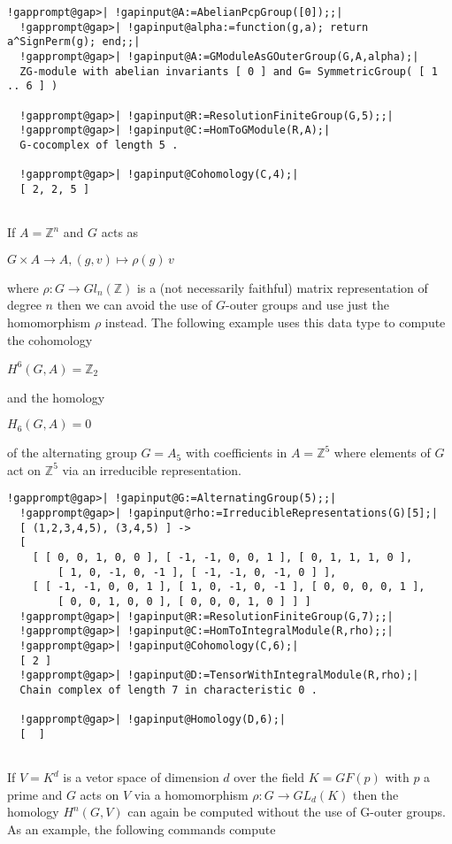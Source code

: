 \documentclass[a4paper,11pt]{report}
\begin{document}
{{\begin{Verbatim}[commandchars=!@|,fontsize=\small,frame=single,label=Example]
  !gapprompt@gap>| !gapinput@A:=AbelianPcpGroup([0]);;|
  !gapprompt@gap>| !gapinput@alpha:=function(g,a); return a^SignPerm(g); end;;|
  !gapprompt@gap>| !gapinput@A:=GModuleAsGOuterGroup(G,A,alpha);|
  ZG-module with abelian invariants [ 0 ] and G= SymmetricGroup( [ 1 .. 6 ] )
  
  !gapprompt@gap>| !gapinput@R:=ResolutionFiniteGroup(G,5);;|
  !gapprompt@gap>| !gapinput@C:=HomToGModule(R,A);|
  G-cocomplex of length 5 . 
  
  !gapprompt@gap>| !gapinput@Cohomology(C,4);|
  [ 2, 2, 5 ]
  
\end{Verbatim}
 

 If $A=\mathbb Z^n$ and $G$ acts as 

$G\times A \rightarrow A, (g, v) \mapsto \rho(g)\, v $ 

 where $\rho\colon G\rightarrow Gl_n(\mathbb Z)$ is a (not necessarily faithful) matrix representation of degree $n$ then we can avoid the use of $G$-outer groups and use just the homomorphism $\rho$ instead. The following example uses this data type to compute the cohomology 

$H^6(G,A) =\mathbb Z_2 $ 

and the homology 

$H_6(G,A) = 0 $ 

 of the alternating group $G=A_5$ with coefficients in $A=\mathbb Z^5$ where elements of $G$ act on $\mathbb Z^5$ via an irreducible representation. 
\begin{Verbatim}[commandchars=!@|,fontsize=\small,frame=single,label=Example]
  !gapprompt@gap>| !gapinput@G:=AlternatingGroup(5);;|
  !gapprompt@gap>| !gapinput@rho:=IrreducibleRepresentations(G)[5];|
  [ (1,2,3,4,5), (3,4,5) ] -> 
  [ 
    [ [ 0, 0, 1, 0, 0 ], [ -1, -1, 0, 0, 1 ], [ 0, 1, 1, 1, 0 ], 
        [ 1, 0, -1, 0, -1 ], [ -1, -1, 0, -1, 0 ] ], 
    [ [ -1, -1, 0, 0, 1 ], [ 1, 0, -1, 0, -1 ], [ 0, 0, 0, 0, 1 ], 
        [ 0, 0, 1, 0, 0 ], [ 0, 0, 0, 1, 0 ] ] ]
  !gapprompt@gap>| !gapinput@R:=ResolutionFiniteGroup(G,7);;|
  !gapprompt@gap>| !gapinput@C:=HomToIntegralModule(R,rho);;|
  !gapprompt@gap>| !gapinput@Cohomology(C,6);|
  [ 2 ]
  !gapprompt@gap>| !gapinput@D:=TensorWithIntegralModule(R,rho);|
  Chain complex of length 7 in characteristic 0 . 
  
  !gapprompt@gap>| !gapinput@Homology(D,6);|
  [  ]
  
\end{Verbatim}
 

If $V=K^d$ is a vetor space of dimension $d$ over the field $K=GF(p)$ with $p$ a prime and $G$ acts on $V$ via a homomorphism $\rho\colon G\rightarrow GL_d(K)$ then the homology $H^n(G,V)$ can again be computed without the use of G-outer groups. As an example, the
following commands compute 

}}
\end{document}
